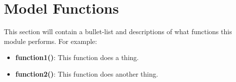 \section{Model Functions}
This section will contain a bullet-list and descriptions of what functions this module performs. For example:
\begin{itemize}
	\item \textbf{function1()}: This function does a thing.
	\item \textbf{function2()}: This function does another thing.
\end{itemize}